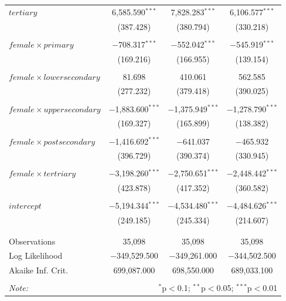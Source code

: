 \documentclass[a4paper]{article}\usepackage[]{graphicx}\usepackage[]{color}
\begin{document}
\begin{table}[H]
\begin{tabular}{@{\extracolsep{5pt}}lccc}
 $tertiary$ & 6,585.590$^{***}$ & 7,828.283$^{***}$ & 6,106.577$^{***}$ \\ 
  & (387.428) & (380.794) & (330.218) \\ 
  & & & \\ 
 $female \times primary$ & $-$708.317$^{***}$ & $-$552.042$^{***}$ & $-$545.919$^{***}$ \\ 
  & (169.216) & (166.955) & (139.154) \\ 
  & & & \\ 
 $female \times lower secondary$ & 81.698 & 410.061 & 562.585 \\ 
  & (277.232) & (379.418) & (390.025) \\ 
  & & & \\ 
 $female \times upper secondary$ & $-$1,883.600$^{***}$ & $-$1,375.949$^{***}$ & $-$1,278.790$^{***}$ \\ 
  & (169.327) & (165.899) & (138.382) \\ 
  & & & \\ 
 $female \times post secondary$ & $-$1,416.692$^{***}$ & $-$641.037 & $-$465.932 \\ 
  & (396.729) & (390.374) & (330.945) \\ 
  & & & \\ 
 $female \times tertriary$ & $-$3,198.260$^{***}$ & $-$2,750.651$^{***}$ & $-$2,448.442$^{***}$ \\ 
  & (423.878) & (417.352) & (360.582) \\ 
  & & & \\ 
 $intercept$ & $-$5,194.344$^{***}$ & $-$4,534.480$^{***}$ & $-$4,484.626$^{***}$ \\ 
  & (249.185) & (245.334) & (214.607) \\ 
  & & & \\ 
\hline \\[-1.8ex] 
Observations & 35,098 & 35,098 & 35,098 \\ 
Log Likelihood & $-$349,529.500 & $-$349,261.000 & $-$344,502.500 \\ 
Akaike Inf. Crit. & 699,087.000 & 698,550.000 & 689,033.100 \\ 
\hline 
\hline \\[-1.8ex] 
\textit{Note:}  & \multicolumn{3}{r}{$^{*}$p$<$0.1; $^{**}$p$<$0.05; $^{***}$p$<$0.01} \\ 
\end{tabular} 
\end{table} 
\end{document}
